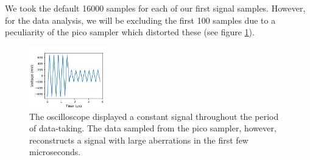 \documentclass[a4paper]{article}
\begin{document}

\quad \quad We took the default 16000 samples for each of our first signal samples. However, for the data analysis, we will be excluding the first 100 samples due to a peculiarity of the pico sampler which distorted these (see figure \ref{fig:pico_start}).


\begin{figure}
\centering
\includegraphics[width=0.3\textwidth]{5-2/pico_bad}
\caption{The oscilloscope displayed a constant signal throughout the period of data-taking. The data sampled from the pico sampler, however, reconstructs a signal with large aberrations in the first few microseconds.}
\label{fig:pico_start}
\end{figure}
\end{document}
